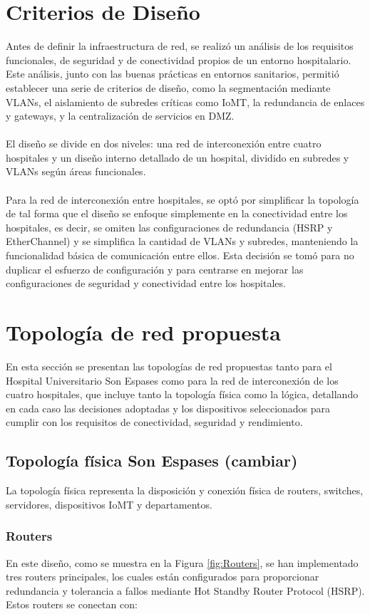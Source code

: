 \section{Criterios de Diseño}
\label{sec:criterios}
Antes de definir la infraestructura de red, se realizó un análisis de los requisitos funcionales, de seguridad y de conectividad propios de un entorno hospitalario. Este 
análisis, junto con las buenas prácticas en entornos sanitarios, permitió establecer una serie de criterios de diseño, como la segmentación mediante VLANs, el aislamiento 
de subredes críticas como IoMT, la redundancia de enlaces y gateways, y la centralización de servicios en DMZ.
\\ \\
El diseño se divide en dos niveles: una red de interconexión entre cuatro hospitales y un diseño interno detallado de un hospital, dividido en subredes y VLANs según áreas funcionales.
\\  \\
Para la red de interconexión entre hospitales, se optó por simplificar la topología de tal forma que el diseño se enfoque simplemente en la conectividad entre los hospitales, es decir,
se omiten las configuraciones de redundancia (HSRP y EtherChannel) y se simplifica la cantidad de VLANs y subredes, manteniendo la funcionalidad básica de comunicación entre ellos. Esta decisión se tomó 
para no duplicar el esfuerzo de configuración y para centrarse en mejorar las configuraciones de seguridad y conectividad entre los hospitales. 

\section{Topología de red propuesta}
En esta sección se presentan las topologías de red propuestas tanto para el Hospital Universitario Son Espases como para la red de interconexión de los cuatro hospitales, que incluye tanto la topología física como la lógica, detallando en cada caso las decisiones adoptadas
y los dispositivos seleccionados para cumplir con los requisitos de conectividad, seguridad y rendimiento.

\subsection{Topología física Son Espases (cambiar)}
La topología física representa la disposición y conexión física de routers, switches, servidores, dispositivos IoMT y departamentos.
\subsubsection{Routers}
En este diseño, como se muestra en la Figura \ref{fig:Routers}, se han implementado tres routers principales, los cuales están configurados para proporcionar 
redundancia y tolerancia a fallos mediante Hot Standby Router Protocol (HSRP). Estos routers se conectan con:

